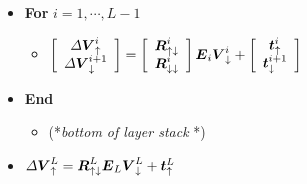 \begin{figure}
{\begin{minipage} {140.0mm}
\begin{itemize}
\begin{itemize}
\item  (*{\em downsweep\/ }*) 
\end{itemize}
\item {\bf  For} $i=1,\cdots,L-1$
\begin{itemize}
\item  $\left[{\begin{array}{c}
{\mit \Delta}{{\mbox{\boldmath$\mit V$\unboldmath}}}_{ \uparrow }^{i}\\ {\mit \Delta}{{\mbox{\boldmath$\mit V$\unboldmath}}}_{ 
\downarrow }^{i+1}\end{array}}\right]=\left[{\begin{array}{c}{  \mbox{\boldmath$\mit R$\unboldmath}}_{ 
\uparrow \downarrow }^{i}\\ {  \mbox{\boldmath$\mit R$\unboldmath}}_{ \downarrow \downarrow 
}^{i}\end{array}}\right] {\mbox{\boldmath$\mit E$\unboldmath}}_{i} {  {\mbox{\boldmath$\mit V$\unboldmath}}}_{ \downarrow 
}^{i}+\left[{\begin{array}{c}{  \mbox{\boldmath$\mit t$\unboldmath}}_{ \uparrow }^{i}\\ {  
\mbox{\boldmath$\mit t$\unboldmath}}_{ \downarrow }^{i+1}\end{array}}\right] $
\end{itemize}
\item {\bf  End}


\begin{itemize}
\item  (*{\em bottom of layer stack\/ }*) 
\end{itemize}
\item  	$
{\mit \Delta}{{\mbox{\boldmath$\mit V$\unboldmath}}}_{ \uparrow }^{L}=
{\mbox{\boldmath$\mit R$\unboldmath}}_{ \uparrow \downarrow }^{L}
{\mbox{\boldmath$\mit E$\unboldmath}}_{L} {{\mbox{\boldmath$\mit V$\unboldmath}}}_{ \downarrow }^{L} +{\mbox{\boldmath$\mit t$\unboldmath}}_{ \uparrow }^{L}$


\end{itemize}

\vspace{6 mm}
\end{minipage}
}
\end{figure}


